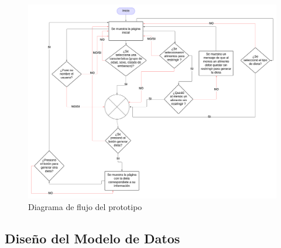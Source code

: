  
\begin{figure}[H]
        \centering
        \includegraphics[width=\textwidth]{img/Diseno/flujo.png}
        \caption{Diagrama de flujo del prototipo}
        \label{fig:flujoDiagrama}
    \end{figure}



\subsection{Dise\~no del Modelo de Datos}

